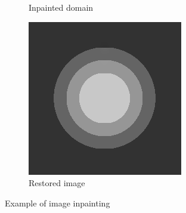 \documentclass[xcolor=dvipsnames, xetex,serif]{beamer}
\begin{document}
\begin{frame}
\begin{figure}[H]
\begin{subfigure}{0.3\linewidth}
                \caption{Inpainted domain}
            \end{subfigure}
            \begin{subfigure}{0.3\linewidth}
                \centering
                \includegraphics[width=0.8\linewidth]{images/grayscale_inpaint/result_splitbergman.png}
                \caption{Restored image}
            \end{subfigure}
            \caption{Example of image inpainting}
        \end{figure}
    \end{frame}
\end{document}

